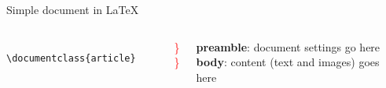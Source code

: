 \copyrightTim

\begin{frame}[fragile, t]{Simple document in \LaTeX}
	\begin{columns}[t]
        \begin{column}{0.5\textwidth}
			\vspace{-20pt}
	\begin{verbatim} 
	\documentclass{article}


	
	







	
	\end{verbatim}

	\phantom{\tiny
	Example text: ``Elementary Illustrations of the Differential and Integral Calculus''
	by Augustus De Morgan
	}\par
\end{column}
\begin{column}{0.05\textwidth}
	\vspace{0pt}

	{\Huge \textcolor{red}{ \} } }\\[1.5cm]
	{\Huge \textcolor{red}{ \} } }
\end{column}
\begin{column}{0.4\textwidth}
	\vspace{0pt}

	\leavevmode\textbf{preamble}: document settings go here\\[1.5cm]
	\textbf{body}: content (text and images) goes here
\end{column}
\end{columns}

\end{frame}